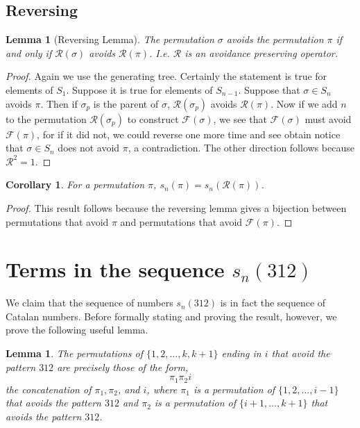 \documentclass[11pt,letterpaper,twoside,english]{article}
\theoremstyle{theorem}
\newtheorem{corollary}[theorem]{Corollary}
\newtheorem{lemma}[theorem]{Lemma}
\theoremstyle{remark}
\begin{document}
\subsection{Reversing}

\begin{lemma}[Reversing Lemma]
The permutation $\sigma$ avoids the permutation $\pi$ if and only if $\mathcal{R}(\sigma)$ avoids $\mathcal{R}(\pi)$. I.e. $\mathcal{R}$ is an avoidance preserving operator. 
\end{lemma}
\begin{proof}
Again we use the generating tree. Certainly the statement is true for elements of $S_1$. Suppose it is true for elements of $S_{n-1}$. Suppose that $\sigma\in S_n$ avoids $\pi$. Then if $\sigma_p$ is the parent of $\sigma$, $\mathcal{R}(\sigma_p)$ avoids $\mathcal{R}(\pi)$. Now if we add $n$ to the permutation $\mathcal{R}(\sigma_p)$ to construct $\mathcal{F}(\sigma)$, we see that $\mathcal{F}(\sigma)$ must avoid $\mathcal{F}(\pi)$, for if it did not, we could reverse one more time and see obtain notice that $\sigma\in S_n$ does not avoid $\pi$, a contradiction. The other direction follows because $\mathcal{R}^2=1$. 
\end{proof}

\begin{corollary} 
For a permutation $\pi$, $s_n(\pi)=s_n(\mathcal{R}(\pi))$. 
\end{corollary}
\begin{proof}
This result follows because the reversing lemma gives a bijection between permutations that avoid $\pi$ and permutations that avoid $\mathcal{F}(\pi)$. 
\end{proof}
\section{Terms in the sequence $s_n(312)$}
\label{S3}

We claim that the sequence of numbers $s_n(312)$ is in fact the sequence of Catalan numbers. Before formally stating and proving the result, however, we prove the following useful lemma.
\begin{lemma}
\label{lemma1}
The permutations of $\{1,2,\dots,k,k+1\}$ ending in $i$ that avoid the pattern $312$ are precisely those of the form,
$$\pi_1 \pi_2 i$$
the concatenation of $\pi_1, \pi_2$, and $i$, where $\pi_1$ is a permutation of $\{1,2,\ldots,i-1\}$ that avoids the pattern $312$ and $\pi_2$ is a permutation of $\{i+1,\ldots,k+1\}$ that avoids the pattern $312$.
\end{lemma}
\end{document}
